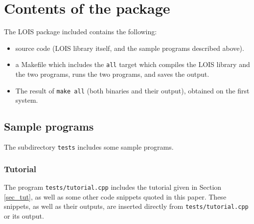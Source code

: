 \section{Contents of the package}

The LOIS package included contains the following:

\begin{itemize}
\item source code (LOIS library itself, and the sample programs described above).
\item a Makefile which includes the {\tt all} target
which compiles the LOIS library and the
two programs, runs the two programs, and saves the output.
\item The result of
{\tt make all} (both binaries and their output), obtained on the first system.
\end{itemize}





\subsection{Sample programs}\label{app:samples}
The subdirectory \verb-tests- includes some sample programs. 

\subsubsection{Tutorial}

The program \verb-tests/tutorial.cpp- includes the tutorial given in 
Section \ref{sec_tut}, as well as some other code snippets quoted in this paper.
These snippets, as well as their outputs, are inserted
directly from \verb-tests/tutorial.cpp- or its output.
                                       
